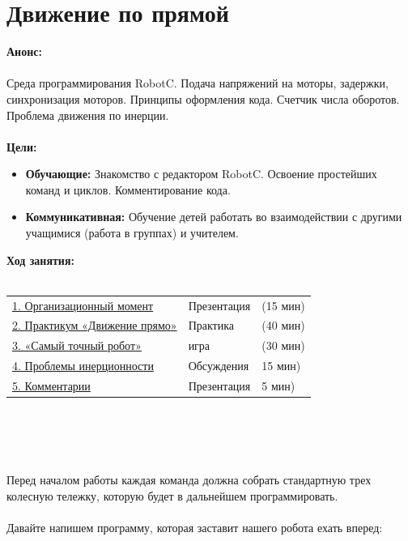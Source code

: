 \chapter{\label{lesson10}Движение по прямой}
{\bfseries Анонс:}\\\\
Среда программирования RobotC. Подача напряжений на моторы, задержки, синхронизация моторов. Принципы оформления кода. Счетчик числа оборотов. Проблема движения по инерции.\\\\
{\bfseries Цели:}
\begin{itemize}
	\item{}{\bfseries Обучающие:} Знакомство с редактором RobotC. Освоение простейших команд и циклов. Комментирование кода.
	\item{}{\bfseries Коммуникативная:} Обучение детей работать во взаимодействии с другими учащимися (работа в группах)   и учителем.\\
\end{itemize}	
{\bfseries Ход занятия:}\\\\
\begin{tabular}{lll}
	\hyperlink{lesson10x1}{1. Организационный момент} & Презентация & (15 мин)\\
	\hyperlink{lesson10x2}{2. Практикум «Движение прямо»} & Практика & (40 мин) \\
	\hyperlink{lesson10x3}{3. «Самый точный робот»} & игра & (30 мин) \\
	\hyperlink{lesson10x4}{4. Проблемы инерционности} & Обсуждения & 15 мин)\\
	\hyperlink{lesson10x5}{5. Комментарии} & Презентация & 5 мин)\\
\end{tabular}\\\\

{\hypertarget{lesson10x1}{}}\\\\ 

Перед началом работы каждая команда должна собрать стандартную трех колесную тележку, которую будет в дальнейшем программировать.
\clearpage
{\hypertarget{lesson10x2}{}}\\\\

Давайте напишем программу, которая заставит нашего робота ехать вперед:\\\\

